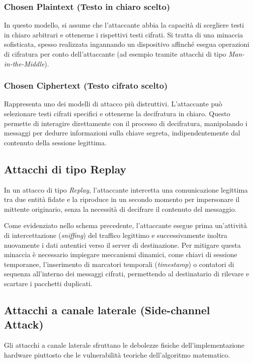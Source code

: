 \subsubsection{Chosen Plaintext (Testo in chiaro scelto)}\label{subsubsec:chosen_plaintext}
In questo modello, si assume che l'attaccante abbia la capacità di scegliere testi in chiaro arbitrari e ottenerne i rispettivi testi cifrati. Si tratta di una minaccia sofisticata, spesso realizzata ingannando un dispositivo affinché esegua operazioni di cifratura per conto dell'attaccante (ad esempio tramite attacchi di tipo \textit{Man-in-the-Middle}).

\subsubsection{Chosen Ciphertext (Testo cifrato scelto)}\label{subsubsec:chosen_ciphertext}
Rappresenta uno dei modelli di attacco più distruttivi. L'attaccante può selezionare testi cifrati specifici e ottenerne la decifratura in chiaro. Questo permette di interagire direttamente con il processo di decifratura, manipolando i messaggi per dedurre informazioni sulla chiave segreta, indipendentemente dal contenuto della sessione legittima.


\subsection{Attacchi di tipo Replay}\label{subsec:attacchi_replay}
In un attacco di tipo \textit{Replay}, l'attaccante intercetta una comunicazione legittima tra due entità fidate e la riproduce in un secondo momento per impersonare il mittente originario, senza la necessità di decifrare il contenuto del messaggio.



Come evidenziato nello schema precedente, l'attaccante esegue prima un'attività di intercettazione (\textit{sniffing}) del traffico legittimo e successivamente inoltra nuovamente i dati autentici verso il server di destinazione. Per mitigare questa minaccia è necessario impiegare meccanismi dinamici, come chiavi di sessione temporanee, l'inserimento di marcatori temporali (\textit{timestamp}) o contatori di sequenza all'interno dei messaggi cifrati, permettendo al destinatario di rilevare e scartare i pacchetti duplicati.


\subsection{Attacchi a canale laterale (Side-channel Attack)}\label{subsec:side_channel}
Gli attacchi a canale laterale sfruttano le debolezze fisiche dell'implementazione hardware piuttosto che le vulnerabilità teoriche dell'algoritmo matematico.



